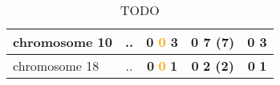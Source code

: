 \begin{table}[H]
\begin{tabular}{||l|c|c|c|c||}
\hline
chromosome 10&..&\textcolor{vert}{\textbf{0}} \textcolor{orange}{\textbf{0}} \textcolor{rose}{\textbf{3}} &\textcolor{vert}{\textbf{0}} \textcolor{rose}{\textbf{7 (7)}} &\textcolor{vert}{\textbf{0}} \textcolor{rose}{\textbf{3}} \\
\hline
chromosome 18&..&\textcolor{vert}{\textbf{0}} \textcolor{orange}{\textbf{0}} \textcolor{rose}{\textbf{1}} &\textcolor{vert}{\textbf{0}} \textcolor{rose}{\textbf{2 (2)}} &\textcolor{vert}{\textbf{0}} \textcolor{rose}{\textbf{1}} \\
\hline
\hline
		\end{tabular}
	\caption{TODO}
	\label{tab:TODO}
\end{table}